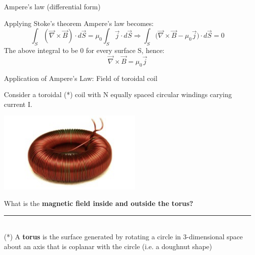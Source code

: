 \begin{frame}{Ampere's law (differential form)}
\vspace{0.3cm}

Applying Stoke's theorem Ampere's law becomes:
\begin{equation*}
    \int_{S} (\vec{\nabla} \times \vec{B}) \cdot d\vec{S} = \mu_0 \int_{S} \vec{j} \cdot d\vec{S} \Rightarrow
    \int_{S} \Big( \vec{\nabla} \times \vec{B} - \mu_0 \vec{j} \Big) \cdot d\vec{S} = 0
\end{equation*}
The above integral to be 0 for every surface S, hence:
\begin{equation*}
    \vec{\nabla} \times \vec{B} = \mu_0 \vec{j}
\end{equation*}

\end{frame}


%
%
%


\begin{frame}{Application of Ampere's Law: Field of toroidal coil}

Consider a toroidal (*) coil with N equally spaced circular windings carying current I.\\
\vspace{0.1cm}

\begin{center}
     \includegraphics[width=0.53\textwidth]{./images/photos/toroidal_coil.png}
\end{center}

What is the {\bf magnetic field inside and outside the torus?}\\

\vspace{0.1cm}
\noindent\rule{2cm}{0.4pt}\\
{\small
   (*) A {\bf torus} is the surface generated by rotating a circle in 3-dimensional space about
       an axis that is coplanar with the circle (i.e. a doughnut shape)
}

\end{frame}



